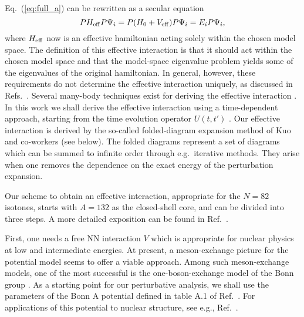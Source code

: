 Eq.\ (\ref{eq:full_a})  can be rewritten as a secular equation
\begin{equation}
    PH_{\rm{eff}}P\Psi_i=P(H_{0}+V_{\rm{eff}})
    P\Psi_i=E_iP\Psi_i,
\end{equation}
where $H_{\rm{eff}}$  now is an effective hamiltonian acting solely
within the chosen model space. The definition of this effective interaction
is that it should act within the chosen model space and that the model-space
eigenvalue problem yields some of the
eigenvalues of the original hamiltonian. In general, however, 
these requirements do not determine the effective interaction
uniquely, as discussed in Refs.\ \cite{hko95,ko90,so95,sok94}. Several
many-body techniques exist for deriving the effective interaction
\cite{hko95,so95,sok94}. In this work we shall derive the effective
interaction using a time-dependent approach, starting from the time 
evolution operator $U(t,t')$ \cite{ko90}.
Our effective interaction is derived by the so-called folded-diagram 
expansion method of Kuo and co-workers \cite{ko90} (see below). The folded 
diagrams represent a set of diagrams which can be summed to infinite order 
through e.g.\ iterative methods. They arise when one removes the 
dependence on the exact energy of the perturbation expansion. 

Our scheme to obtain an effective interaction, appropriate for the $N=82$ 
isotones, starts with $A=132$ as the closed-shell core, and  can be divided 
into three steps. A  more detailed exposition can be found in Ref.\ 
\cite{hko95}.

First, one needs a free NN interaction $V$ which is
appropriate for nuclear physics at low and intermediate energies. At
present, a meson-exchange picture for the potential model seems to offer a
viable approach. Among such meson-exchange
models, one of the most successful is the one-boson-exchange model of the
Bonn group \cite{mac89}. As a starting point for our perturbative analysis, 
we shall use the parameters of the Bonn A potential defined in table A.1 of 
Ref.\ \cite{mac89}. For applications of this potential to 
nuclear structure, see e.g., Ref.\ \cite{mac89}.

